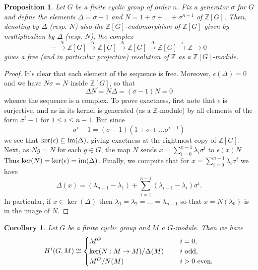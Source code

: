 \documentclass[11pt]{amsart}
\numberwithin{equation}{section}
\newtheorem{cor}[equation]{Corollary}
\newtheorem{proposition}[equation]{Proposition}
\theoremstyle{remark}
\theoremstyle{remark}
\theoremstyle{remark}
\theoremstyle{definition}
\theoremstyle{definition}
\theoremstyle{definition}
\theoremstyle{definition}
\theoremstyle{definition}
\theoremstyle{definition}
\begin{document}
\begin{proposition} \label{cyclic resolution}
Let $G$ be a finite cyclic group of order $n$. Fix a generator $\sigma$ for $G$ and define the elements $\Delta=\sigma-1$ and $N=1+\sigma+...+\sigma^{n-1}$ of $\mathbb{Z}[G]$. Then, denoting by $\Delta$ (resp. $N$) also the $\mathbb{Z}[G]$-endomorphism of $\mathbb{Z}[G]$ given by multiplication by $\Delta$ (resp. $N$),  the complex
\[\cdots \stackrel{N}{\longrightarrow}\mathbb{Z}[G]\stackrel{\Delta}{\longrightarrow}\mathbb{Z}[G]\stackrel{N}{\longrightarrow}\mathbb{Z}[G] \stackrel{\Delta}{\longrightarrow} \mathbb{Z}[G] \stackrel{\epsilon}{\longrightarrow} \mathbb{Z} \longrightarrow 0 \]
gives a free (and in particular projective) resolution of $\mathbb{Z}$ as a $\mathbb{Z}[G]$-module.
\end{proposition}

\begin{proof}
It's clear that each element of the sequence is free. Moreover, $\epsilon(\Delta)=0$ and we have $N\sigma=N$ inside $\mathbb{Z}[G]$, so that 
\[\Delta N =N\Delta =(\sigma -1)N=0\]
whence the sequence is a complex. To prove exactness, first note that $\epsilon$ is surjective, and as in   its kernel is generated (as a $\mathbb{Z}$-module) by all elements of the form $\sigma^{i}-1$ for $1\leq i \leq n-1$. But since 
 \[\sigma^i-1=(\sigma-1)(1+\sigma+...\sigma^{i-1})\]
 we see that $\ker(\epsilon)\subseteq \textup{im}(\Delta)$, giving exactness at the rightmost copy of $\mathbb{Z}[G]$. Next, as $Ng=N$ for each $g\in G$,  the map $N$ sends $x=\sum_{i=0}^{n-1}\lambda_i \sigma^i$ to $\epsilon(x)N$
Thus $\ker(N)=\ker(\epsilon)=\textup{im}(\Delta)$. Finally, we compute that for $x=\sum_{i=0}^{n-1}\lambda_i \sigma^i$  we have
\[\Delta(x)=(\lambda_{n-1}-\lambda_1)+\sum_{i=1}^{n-1}(\lambda_{i-1}-\lambda_i)\sigma^{i}.\]
In particular, if $x\in \ker(\Delta)$ then $\lambda_1=\lambda_2=...=\lambda_{n-1}$ so that $x=N(\lambda_0)$ is in the image of $N$. 
\end{proof}

\begin{cor} \label{cohom of cyclic groups}
Let $G$ be a finite cyclic group and $M$ a $G$-module. Then we have
\[H^i(G,M)\cong\begin{cases}
M^G~~&~~i=0,\\ 
\textup{ker}(N:M\rightarrow M)/\Delta(M)~~&~~i\textup{ odd},\\
M^G/N(M)~~&~~i>0\textup{ even}.
\end{cases}\]
\end{cor}
\end{document}
